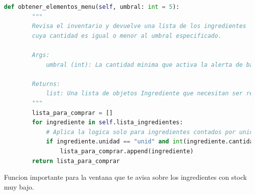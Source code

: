 \documentclass[a4paper,12pt]{article}
\begin{document}
\begin{lstlisting}[language=Python, caption={Cambio de codigo}, frame=single]
    def obtener_elementos_menu(self, umbral: int = 5):
        """
        Revisa el inventario y devuelve una lista de los ingredientes
        cuya cantidad es igual o menor al umbral especificado.

        Args:
            umbral (int): La cantidad minima que activa la alerta de bajo stock.

        Returns:
            list: Una lista de objetos Ingrediente que necesitan ser repuestos.
        """
        lista_para_comprar = []
        for ingrediente in self.lista_ingredientes:
            # Aplica la logica solo para ingredientes contados por unidad
            if ingrediente.unidad == "unid" and int(ingrediente.cantidad) <= umbral:
                lista_para_comprar.append(ingrediente)
        return lista_para_comprar
\end{lstlisting}
Funcion importante para la ventana que te avisa sobre los ingredientes con stock muy bajo.
\end{document}
